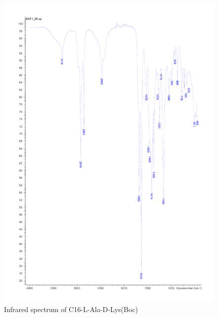 \begin{figure}[ht!]
\centering
\includegraphics[scale=0.6]{IR/KAT1_29.pdf}
\caption{Infrared spectrum of C16-L-Ala-D-Lys(Boc)}
\end{figure}

